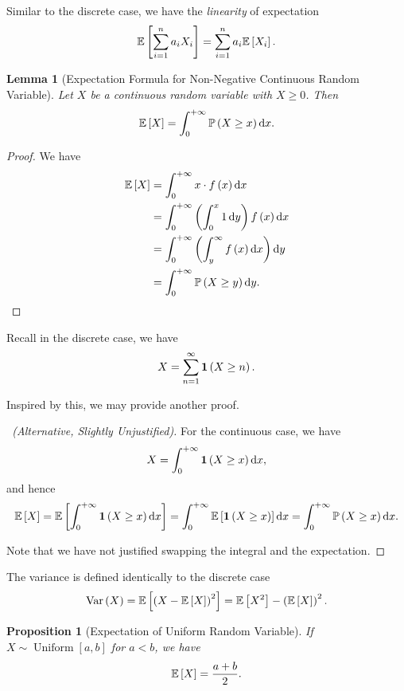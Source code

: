 \documentclass{article}
\newtheorem{lemma}[theorem]{Lemma}
\newtheorem{proposition}[theorem]{Proposition}
\theoremstyle{definition}
\theoremstyle{remark}
\newcommand{\Prob}{\mathbb{P}}
\newcommand{\Expt}{\mathbb{E}}
\newcommand{\plusinfty}{+\infty}
\newcommand{\indicator}{\mathbf{1}}
\newcommand{\ccintv}[2]{[#1,#2]}
\newcommand{\Var}{\operatorname{Var}}
\newcommand{\Uniform}{\operatorname{Uniform}}
\begin{document}
Similar to the discrete case, we have the \emph{linearity} of expectation
\[
    \Expt\bqty{\sum_{i = 1}^{n} a_i X_i} = \sum_{i = 1}^{n} a_i \Expt\bqty{X_i}.
\]

\begin{lemma}[Expectation Formula for Non-Negative Continuous Random Variable]
    \label{lem:formula-expectation-non-negative-continuous-random-variable}
    Let \(X\) be a continuous random variable with \(X \geq 0\). Then
    \[
        \Expt\bqty{X} = \int_{0}^{\plusinfty} \Prob\pqty{X \geq x} \dd{x}.
    \]
\end{lemma}

\begin{proof}
    We have
    \begin{align*}
        \Expt\bqty{X} &= \int_{0}^{\plusinfty} x \cdot f\pqty{x} \dd{x} \\
        &= \int_{0}^{\plusinfty} \pqty{\int_{0}^{x} 1 \dd{y}} f\pqty{x} \dd{x} \\
        &= \int_{0}^{\plusinfty} \pqty{\int_{y}^{\infty} f\pqty{x} \dd{x}} \dd{y} \\
        &= \int_{0}^{\plusinfty} \Prob\pqty{X \geq y} \dd{y}. 
    \end{align*}
\end{proof}

Recall in the discrete case, we have
\[
    X = \sum_{n = 1}^{\infty} \indicator\pqty{X \geq n}.
\]

Inspired by this, we may provide another proof.

\begin{proof}[\proofname\ (Alternative, Slightly Unjustified)]
    For the continuous case, we have
    \[
        X = \int_{0}^{\plusinfty} \indicator\pqty{X \geq x} \dd{x},
    \]
    and hence
    \[
        \Expt\bqty{X} = \Expt\bqty{\int_{0}^{\plusinfty} \indicator\pqty{X \geq x} \dd{x}} = \int_{0}^{\plusinfty} \Expt\bqty{\indicator\pqty{X \geq x}} \dd{x} = \int_{0}^{\plusinfty} \Prob\pqty{X \geq x} \dd{x}.
    \]

    Note that we have not justified swapping the integral and the expectation.
\end{proof}

The variance is defined identically to the discrete case
\[
    \Var\pqty{X} = \Expt\bqty{\pqty{X - \Expt\bqty{X}}^2} = \Expt\bqty{X^2} - \pqty{\Expt\bqty{X}}^2.
\]

\begin{proposition}[Expectation of Uniform Random Variable]
    \label{prop:expt-uniform}%
    If \(X \sim \Uniform\ccintv{a}{b}\) for \(a < b\), we have
    \[
        \Expt\bqty{X} = \frac{a + b}{2}.
    \]
\end{proposition}
\end{document}
